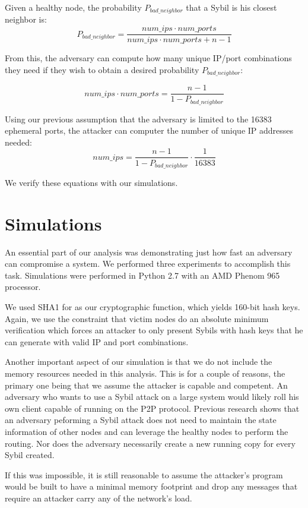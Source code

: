 \documentclass[a4paper]{article}
\begin{document}
Given a healthy node, the probability $P_{bad\_neighbor}$ that a Sybil is his closest neighbor is:
\begin{equation}
P_{bad\_neighbor} =  \frac{num\_ips \cdot num\_ports}{num\_ips \cdot num\_ports + n - 1}
\label{eq:bad}
\end{equation}

From this, the adversary can compute how many unique IP/port combinations they need if they wish to obtain a desired probability $P_{bad\_neighbor}$:

$$ num\_ips \cdot num\_ports =  \frac{n - 1}{1 - P_{bad\_neighbor} }$$

Using our previous assumption that the adversary is limited to the 16383 ephemeral ports, the attacker can computer the number of unique IP addresses needed:
$$ num\_ips  =  \frac{n - 1}{1 - P_{bad\_neighbor} }  \cdot \frac{1}{16383}$$


We verify these equations with our simulations.

\section{Simulations}
An essential part of our analysis was demonstrating just how fast an adversary can compromise a system.
We performed three experiments to accomplish this task.
Simulations were performed in Python 2.7  with an AMD Phenom 965 processor.  

We used SHA1 for as our cryptographic function, which yields 160-bit hash keys.
Again, we use the constraint that victim nodes do an absolute minimum verification which forces an attacker to only present Sybils with hash keys that he can generate with valid IP and port combinations.

Another important aspect of our simulation is that we do not include the memory resources needed in this analysis.
This is for a couple of reasons, the primary one being that we assume the attacker is capable and competent.
An adversary who wants to use a Sybil attack on a large system would likely roll his own client capable of running on the P2P protocol.
Previous research \cite{mainlinesybil} shows that an adversary peforming a Sybil attack does not need to maintain the state information of other nodes and can leverage the healthy nodes to perform the routing.
Nor does the adversary necessarily create a new running copy for every Sybil created. 

If this was impossible, it is still reasonable to assume the attacker's program would be built to have a minimal memory footprint and drop any messages that require an attacker carry any of the network's load.
\end{document}
